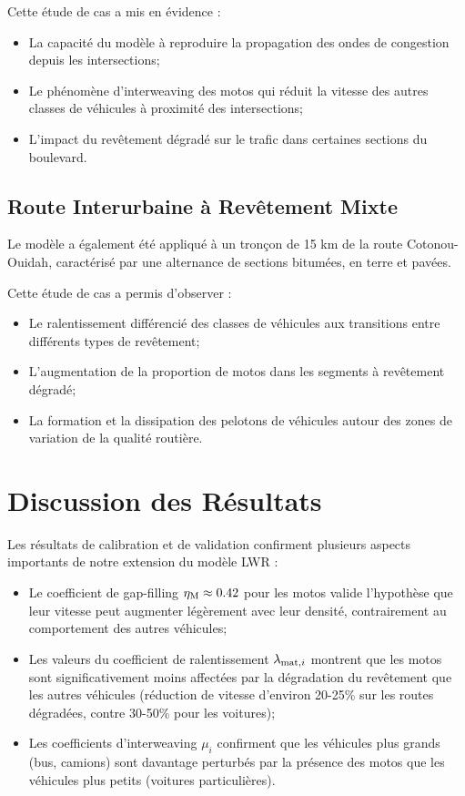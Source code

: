 Cette étude de cas a mis en évidence :
\begin{itemize}
\item La capacité du modèle à reproduire la propagation des ondes de congestion depuis les intersections;
\item Le phénomène d'interweaving des motos qui réduit la vitesse des autres classes de véhicules à proximité des intersections;
\item L'impact du revêtement dégradé sur le trafic dans certaines sections du boulevard.
\end{itemize}

\subsection{Route Interurbaine à Revêtement Mixte}
\label{subsec:route_interurbaine}

Le modèle a également été appliqué à un tronçon de 15 km de la route Cotonou-Ouidah, caractérisé par une alternance de sections bitumées, en terre et pavées.

Cette étude de cas a permis d'observer :
\begin{itemize}
\item Le ralentissement différencié des classes de véhicules aux transitions entre différents types de revêtement;
\item L'augmentation de la proportion de motos dans les segments à revêtement dégradé;
\item La formation et la dissipation des pelotons de véhicules autour des zones de variation de la qualité routière.
\end{itemize}

\section{Discussion des Résultats}
\label{sec:discussion_resultats}

Les résultats de calibration et de validation confirment plusieurs aspects importants de notre extension du modèle LWR :

\begin{itemize}
\item Le coefficient de gap-filling $\eta_{\text{M}} \approx 0.42$ pour les motos valide l'hypothèse que leur vitesse peut augmenter légèrement avec leur densité, contrairement au comportement des autres véhicules;

\item Les valeurs du coefficient de ralentissement $\lambda_{\text{mat},{i}}$ montrent que les motos sont significativement moins affectées par la dégradation du revêtement que les autres véhicules (réduction de vitesse d'environ 20-25\% sur les routes dégradées, contre 30-50\% pour les voitures);

\item Les coefficients d'interweaving $\mu_i$ confirment que les véhicules plus grands (bus, camions) sont davantage perturbés par la présence des motos que les véhicules plus petits (voitures particulières).
\end{itemize}

